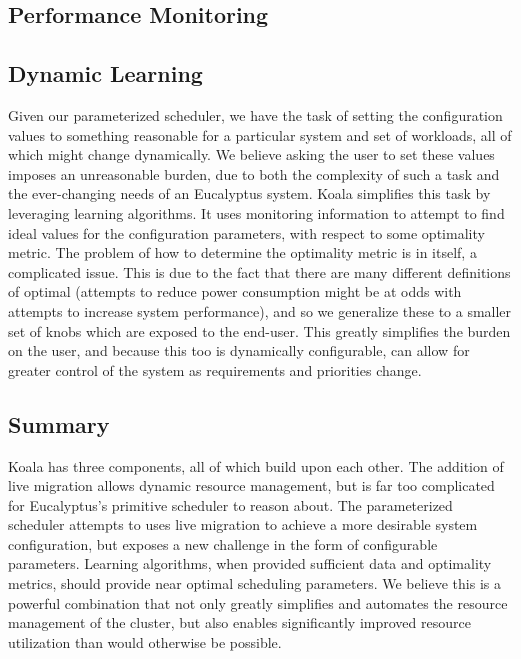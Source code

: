 \subsection{Performance Monitoring}


\subsection{Dynamic Learning}
Given our parameterized scheduler, we have the task of setting the
configuration values to something reasonable for a particular system and set of
workloads, all of which might change dynamically.  We believe asking the user
to set these values imposes an unreasonable burden, due to both the complexity
of such a task and the ever-changing needs of an Eucalyptus system.  Koala
simplifies this task by leveraging learning algorithms.  It uses monitoring
information to attempt to find ideal values for the configuration parameters,
with respect to some optimality metric.  The problem of how to determine the
optimality metric is in itself, a complicated issue.  This is due to the fact
that there are many different definitions of optimal (attempts to reduce power
consumption might be at odds with attempts to increase system performance), and
so we generalize these to a smaller set of knobs which are exposed to the
end-user.  This greatly simplifies the burden on the user, and because this too
is dynamically configurable, can allow for greater control of the system as
requirements and priorities change.

\subsection{Summary}

Koala has three components, all of which build upon each other.  The addition
of live migration allows dynamic resource management, but is far too
complicated for Eucalyptus's primitive scheduler to reason about.  The
parameterized scheduler attempts to uses live migration to achieve a more
desirable system configuration, but exposes a new challenge in the form of
configurable parameters.  Learning algorithms, when provided sufficient data
and optimality metrics, should provide near optimal scheduling parameters.  We
believe this is a powerful combination that not only greatly simplifies and
automates the resource management of the cluster, but also enables
significantly improved resource utilization than would otherwise be possible.
